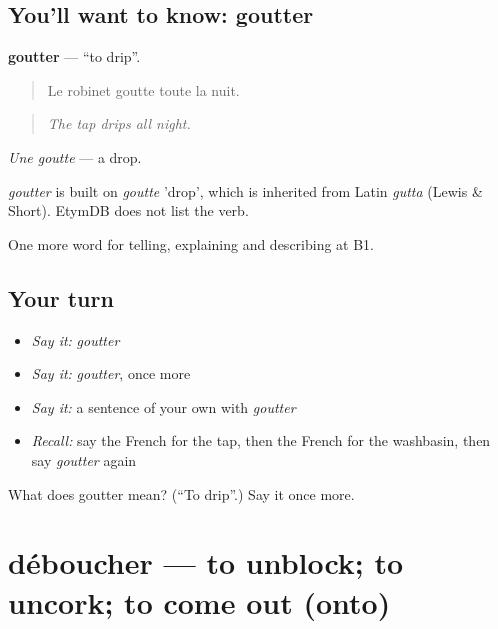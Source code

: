 \subsection*{You'll want to know: goutter}
\textbf{goutter} — \textquotedblleft{}to drip\textquotedblright{}.

\begin{quote}
Le robinet goutte toute la nuit.
\end{quote}

\begin{quote}
\emph{The tap drips all night.}
\end{quote}

\emph{Une goutte} — a drop.

\begin{cousinweb}
\emph{goutter} is built on \emph{goutte} 'drop', which is inherited from Latin \emph{gutta} (Lewis \& Short). EtymDB does not list the verb.
\end{cousinweb}

\begin{grammarlens}[title={What you've built}]
One more word for telling, explaining and describing at B1.
\end{grammarlens}

\subsection*{Your turn}
\begin{itemize}
\raggedright
  \item \emph{Say it:} \emph{goutter}
  \item \emph{Say it:} \emph{goutter}, once more
  \item \emph{Say it:} a sentence of your own with \emph{goutter}
  \item \emph{Recall:} say the French for the tap, then the French for the washbasin, then say \emph{goutter} again
\end{itemize}

\begin{tcolorbox}[breakable,colback=teal!4,colframe=teal!35!black,title={Before you move on}]
What does goutter mean? (\textquotedblleft{}To drip\textquotedblright{}.) Say it once more.
\end{tcolorbox}
\section[déboucher]{déboucher — to unblock; to uncork; to come out (onto)}

